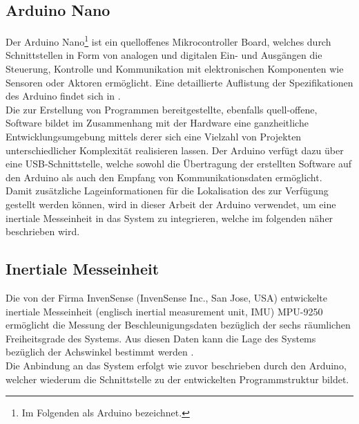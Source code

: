 \subsection{Arduino\textsuperscript{\texttrademark} Nano}
\label{chap.arduino}
Der Arduino\textsuperscript{\texttrademark} Nano\footnote{Im Folgenden als Arduino bezeichnet.} ist ein quelloffenes Mikrocontroller Board, welches durch Schnittstellen in Form von analogen und digitalen Ein- und Ausgängen die Steuerung, Kontrolle und Kommunikation mit elektronischen Komponenten wie Sensoren oder Aktoren ermöglicht. Eine detaillierte Auflistung der Spezifikationen des Arduino findet sich in .\\
Die zur Erstellung von Programmen bereitgestellte, ebenfalls quell-offene, Software bildet im Zusammenhang mit der Hardware eine ganzheitliche Entwicklungsumgebung mittels derer sich eine Vielzahl von Projekten unterschiedlicher Komplexität realisieren lassen. Der Arduino verfügt dazu über eine USB-Schnittstelle, welche sowohl die Übertragung der erstellten Software auf den Arduino als auch den Empfang von Kommunikationsdaten ermöglicht.\\
Damit zusätzliche Lageinformationen für die Lokalisation des  zur Verfügung gestellt werden können, wird in dieser Arbeit der Arduino verwendet, um eine inertiale Messeinheit in das System zu integrieren, welche im folgenden näher beschrieben wird.

\prever{
}


\subsection{Inertiale Messeinheit}
\label{chap.imu}
Die von der Firma InvenSense (InvenSense Inc., San Jose, USA) entwickelte inertiale Messeinheit (englisch inertial measurement unit, IMU) MPU-9250 ermöglicht die Messung der Beschleunigungsdaten bezüglich der sechs räumlichen Freiheitsgrade des Systems. Aus diesen Daten kann die Lage des Systems bezüglich der Achswinkel bestimmt werden \cite{IMU}.\\
Die Anbindung an das System erfolgt wie zuvor beschrieben durch den Arduino, welcher wiederum die Schnittstelle zu der entwickelten Programmstruktur bildet.\\

